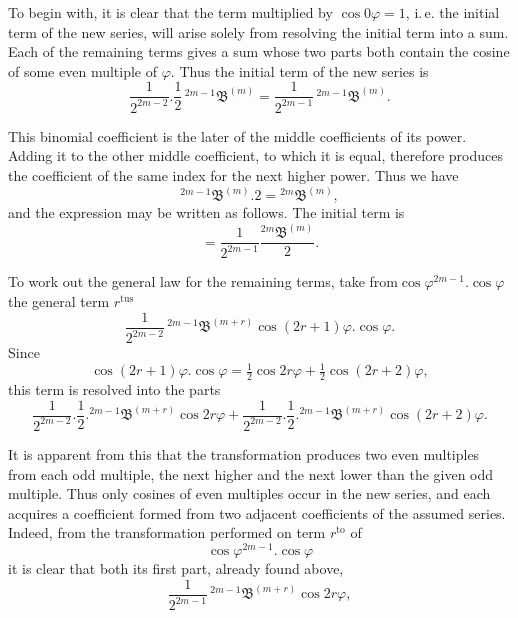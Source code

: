 \par\noindent{}%
\hspace*{\parindent}To begin with, it is clear that the term multiplied by $\cos 0\varphi = 1$, i.\,e. the initial term of the new series, will arise solely from resolving the initial term into a sum. Each of the remaining terms gives a sum whose two parts both contain the cosine of some even multiple of $\varphi$. Thus the initial term of the new series is
\[
\frac{1}{2^{2m-2}} . \frac{1}{2}\,{}^{2m-1}\mathfrak{B}^{(m)}
= \frac{1}{2^{2m-1}}\,{}^{2m-1}\mathfrak{B}^{(m)}.
\]

\par\noindent This binomial coefficient is the later of the middle coefficients of its power. Adding it to the other middle coefficient, to which it is equal, therefore produces the coefficient of the same index for the next higher power. Thus we have
\[
{}^{2m-1}\mathfrak{B}^{(m)} .  2 = {}^{2m}\mathfrak{B}^{(m)},
\]
and the expression may be written as follows. The initial term is
\[
= \frac{1}{2^{2m-1}}\frac{{}^{2m}\mathfrak{B}^{(m)}}{2}.
\]

\par\noindent To work out the general law for the remaining terms, take from\hfill\mbox{}\linebreak $\cos\varphi^{2m-1} . \cos\varphi$
the general term $r^{\text{tus}}$
\[
\frac{1}{2^{2m-2}}\,{}^{2m-1}\mathfrak{B}^{(m+r)}\cos(2r+1)\varphi . \cos\varphi.
\]
Since
\[
\cos(2r+1)\varphi . \cos\varphi = \tfrac{1}{2}\cos 2r\varphi + \tfrac{1}{2}\cos(2r+2)\varphi,
\]
this term is resolved into the parts
\[
\frac{1}{2^{2m-2}} . \frac{1}{2} . {}^{2m-1}\mathfrak{B}^{(m+r)}\cos 2r\varphi
+ \frac{1}{2^{2m-2}} . \frac{1}{2} . {}^{2m-1}\mathfrak{B}^{(m+r)}\cos(2r+2)\varphi.
\]

It is apparent from this that the transformation produces two even multiples from each odd multiple, the next higher and the next lower than the given odd multiple. Thus only cosines of even multiples occur in the new series, and each acquires a coefficient formed from two adjacent coefficients of the assumed series. Indeed, from the transformation performed on term $r^{\text{to}}$ of
\[
\cos\varphi^{2m-1} . \cos\varphi
\]
it is clear that both its first part, already found above,
\[
\frac{1}{2^{2m-1}}\,{}^{2m-1}\mathfrak{B}^{(m+r)}\cos 2r\varphi,
\]
